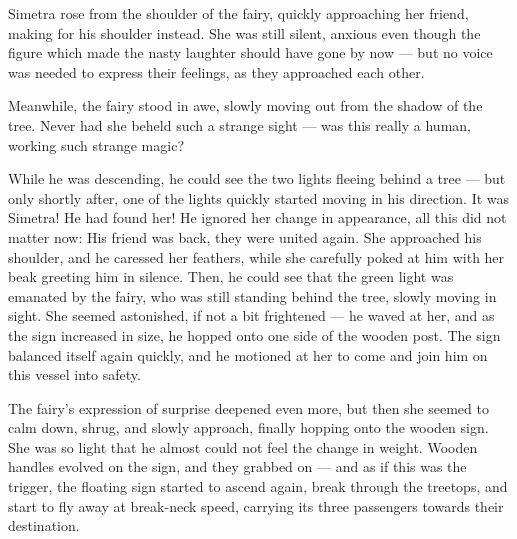Simetra rose from the shoulder of the fairy, quickly approaching her friend, making for his shoulder instead. She was still silent, anxious even though the figure which made the nasty laughter should have gone by now --- but no voice was needed to express their feelings, as they approached each other.

Meanwhile, the fairy stood in awe, slowly moving out from the shadow of the tree. Never had she beheld such a strange sight --- was this really a human, working such strange magic?

\fancybreaker{}

While he was descending, he could see the two lights fleeing behind a tree --- but only shortly after, one of the lights quickly started moving in his direction. It was Simetra! He had found her! 
He ignored her change in appearance, all this did not matter now: His friend was back, they were united again. She approached his shoulder, and he caressed her feathers, while she carefully poked at him with her beak greeting him in silence. Then, he could see that the green light was emanated by the fairy, who was still standing behind the tree, slowly moving in sight. She seemed astonished, if not a bit frightened --- he waved at her, and as the sign increased in size, he hopped onto one side of the wooden post. The sign balanced itself again quickly, and he motioned at her to come and join him on this vessel into safety.

The fairy's expression of surprise deepened even more, but then she seemed to calm down, shrug, and slowly approach, finally hopping onto the wooden sign. She was so light that he almost could not feel the change in weight. Wooden handles evolved on the sign, and they grabbed on --- and as if this was the trigger, the floating sign started to ascend again, break through the treetops, and start to fly away at break-neck speed, carrying its three passengers towards their destination.
